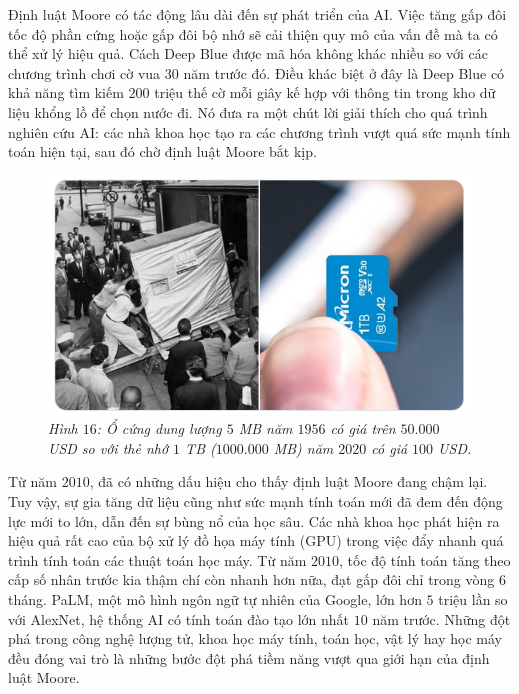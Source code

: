 \begin{multicols}{2}
	\vskip 0.1cm
	Định luật Moore có tác động lâu dài đến sự phát triển của AI. Việc tăng gấp đôi tốc độ phần cứng  hoặc gấp đôi bộ nhớ sẽ cải thiện quy mô của vấn đề mà ta có thể xử lý hiệu quả. Cách Deep Blue được mã hóa không khác nhiều so với các chương trình chơi cờ vua $30$ năm trước đó. Điều khác biệt ở đây là Deep Blue có khả năng tìm kiếm $200$ triệu thế cờ mỗi giây kế hợp với thông tin trong kho dữ liệu khổng lồ để chọn nước đi. Nó đưa ra một chút lời giải thích cho quá trình nghiên cứu AI: các nhà khoa học tạo ra các chương trình vượt quá sức mạnh tính toán hiện tại, sau đó chờ định luật Moore bắt kịp.
	\begin{figure}[H]
		\vspace*{-5pt}
		\centering
		\captionsetup{labelformat= empty, justification=centering}
		\includegraphics[width= 1\linewidth]{Disk.png}
		\caption{\small\textit{\color{cackithi}Hình $16$: Ổ cứng dung lượng $5$ MB năm $1956$ có giá trên $50{.}000$ USD so với thẻ nhớ $1$ TB ($1000{.}000$ MB) năm $2020$ có giá $100$ USD.}}
		\vspace*{-10pt}
	\end{figure}
	Từ năm $2010$, đã có những dấu hiệu cho thấy định luật Moore đang chậm lại. Tuy vậy, sự gia tăng dữ liệu cũng như sức mạnh tính toán mới đã đem đến động lực mới to lớn, dẫn đến sự bùng nổ của học sâu. Các nhà khoa học phát hiện ra hiệu quả rất cao của bộ xử lý đồ họa máy tính (GPU) trong việc đẩy nhanh quá trình tính toán các thuật toán học máy. Từ năm $2010$, tốc độ tính toán tăng theo cấp số nhân trước kia thậm chí còn nhanh hơn nữa, đạt gấp đôi chỉ trong vòng $6$ tháng. PaLM, một mô hình ngôn ngữ tự nhiên của Google, lớn hơn $5$ triệu lần so với AlexNet, hệ thống AI có tính toán đào tạo lớn nhất $10$ năm trước. Những đột phá trong công nghệ lượng tử, khoa học máy tính, toán học, vật lý hay học máy đều đóng vai trò là những bước đột phá tiềm năng vượt qua giới hạn của định luật Moore.

\end{multicols}
